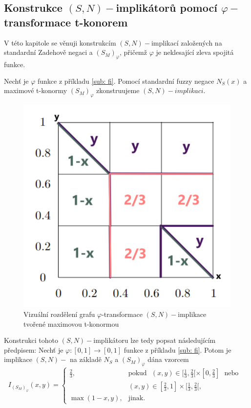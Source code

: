 \subsection{Konstrukce $(S,N)-$implik\'ator\r u pomoc\'i $\varphi-$transformace t-konorem}
 V této kapitole se věnuji konstrukcím $(S,N)-$implikací založených na standardní Zadehově negaci a $(S_M)_\varphi$, přičemž $\varphi$ je neklesající zleva spojitá funkce.
 
\begin{example}
    Nech\v t je $\varphi$ funkce z p\v ríkladu \ref{sub: fi}.  Pomocí standardní fuzzy negace $N_S(x)$ a maximové t-konormy $(S_M)_\varphi$  zkonstruujeme $(S,N)-implikaci$. 
\end{example}

\begin{figure}[H]
\caption{ Vizu\' aln\' i rozd\v elen\'i grafu $\varphi$-transformace $(S,N)-$implikace tvořené maximovou t-konormou\\}
        \centering
        \includegraphics[scale=0.8]{template-fig/phi-impli.pdf}
\end{figure}


 Konstrukci tohoto $(S,N)-$implikátoru lze tedy popsat následujícím předpisem:
    Nech\v t je  $\varphi:[0,1]\rightarrow [0,1]$
funkce z příkladu \ref{sub: fi}.
Potom je implikace $(S,N)-$ na základě $N_S$ a $(S_M)_{\varphi}$ dána vzorcem
$$ I_{(S_M)_{\varphi}}(x,y) = \begin{cases} \frac{2}{3}, &\mbox {pokud~~}
(x,y)\in [\frac{1}{3},\frac{2}{3}[\times[0,\frac{2}{3}] \mbox{~~nebo~~}
\\ & (x,y)\in [\frac{2}{3},1]\times[\frac{1}{3},\frac{2}{3}[,
\\ \max(1-x,y), &\mbox {jinak.}
\end{cases} $$

